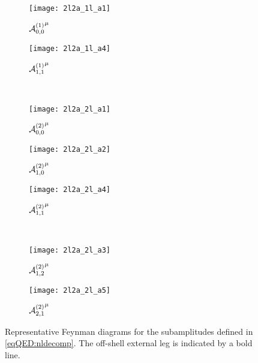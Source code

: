 \documentclass[main.tex]{subfiles}
\begin{document}
\begin{figure}
    \begin{center}
        \begin{subfigure}[c]{0.3\linewidth}
            \centering
            \texttt{[image: 2l2a\_1l\_a1]}
            \caption{${\mathcal{A}^{(1)}_{0, 0}}^{\mu}$}
            \label{fig:1Lbox}
        \end{subfigure}
        \begin{subfigure}[c]{0.3\linewidth}
            \centering
            \vspace{4ex}
            \texttt{[image: 2l2a\_1l\_a4]}
            \vspace{4ex}
            \caption{${\mathcal{A}^{(1)}_{1, 1}}^{\mu}$}
            \label{fig:1Lbubble}
        \end{subfigure}
        \\
        \vspace{1em}
        \begin{subfigure}[c]{0.3\linewidth}
            \centering
            \texttt{[image: 2l2a\_2l\_a1]}
            \caption{${\mathcal{A}^{(2)}_{0, 0}}^{\mu}$}
            \label{fig:2Lbox1}
        \end{subfigure}
        \begin{subfigure}[c]{0.3\linewidth}
            \centering
            \texttt{[image: 2l2a\_2l\_a2]}
            \caption{${\mathcal{A}^{(2)}_{1, 0}}^{\mu}$}
            \label{fig:2Lboxbubble1}
        \end{subfigure}
        \begin{subfigure}[c]{0.3\linewidth}
            \centering
            \texttt{[image: 2l2a\_2l\_a4]}
            \caption{${\mathcal{A}^{(2)}_{1, 1}}^{\mu}$}
            \label{fig:2Lboxbubble2}
        \end{subfigure}
        \\
        \vspace{1em}
        \begin{subfigure}[c]{0.3\linewidth}
            \centering
            \texttt{[image: 2l2a\_2l\_a3]}
            \caption{${\mathcal{A}^{(2)}_{1, 2}}^{\mu}$}
            \label{fig:2Lbox2}
        \end{subfigure}
        \begin{subfigure}[c]{0.3\linewidth}
            \centering
            \vspace{4ex}
            \texttt{[image: 2l2a\_2l\_a5]}
            \vspace{4ex}
            \caption{${\mathcal{A}^{(2)}_{2, 1}}^{\mu}$}
        \end{subfigure}
        \caption{
            Representative Feynman diagrams for the subamplitudes defined in \cref{eqQED:nldecomp}.
            The off-shell external leg is indicated by a bold line.
        }
        \label{fig:repr-diagrams}
    \end{center}
\end{figure}
\end{document}
